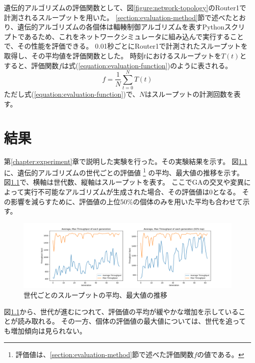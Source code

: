 \documentclass[a4paper,11pt]{jreport}
\newcommand{\figref}[1]{図\ref{#1}}
\newcommand{\chapref}[1]{第\ref{#1}章}
\newcommand{\secref}[1]{\ref{#1}節}
\newcommand{\equationref}[1]{式(\ref{#1})}
\begin{document}
遺伝的アルゴリズムの評価関数として、\figref{figure:network-topology}のRouter1で計測されるスループットを用いた。
\secref{section:evaluation-method}で述べたとおり、遺伝的アルゴリズムの各個体は輻輳制御アルゴリズムを表すPythonスクリプトであるため、これをネットワークシミュレータに組み込んで実行することで、その性能を評価できる。
0.01秒ごとにRouter1で計測されたスループットを取得し、その平均値を評価関数とした。
時刻$t$におけるスループットを$T(t)$とすると、評価関数$f$は\equationref{equation:evaluation-function}のように表される。
\begin{equation}
  \label{equation:evaluation-function}
  f = \frac{1}{N} \sum_{t=0}^{N} T(t)
\end{equation}
ただし\equationref{equation:evaluation-function}で、$N$はスループットの計測回数を表す。

\newpage

\chapter{結果}

\label{chapter:result}
\chapref{chapter:experiment}で説明した実験を行った。その実験結果を示す。
\figref{figure:generation_throughput}に、遺伝的アルゴリズムの世代ごとの評価値
\footnote{評価値は、\secref{section:evaluation-method}で述べた評価関数$f$の値である。}
の平均、最大値の推移を示す。
\figref{figure:generation_throughput}で、横軸は世代数、縦軸はスループットを表す。
ここでGAの交叉や変異によって実行不可能なアルゴリズムが生成された場合、その評価値は0となる。
その影響を減らすために、評価値の上位50\%の個体のみを用いた平均も合わせて示す。
\begin{figure}[htbp]
  \setlength\fboxsep{0pt}
  \centering
  \includegraphics[width=1.0\linewidth]{fig/chap05/generation_throughput.png}
  \caption{世代ごとのスループットの平均、最大値の推移}
  \label{figure:generation_throughput}
\end{figure}
\figref{figure:generation_throughput}から、世代が進むにつれて、評価値の平均が緩やかな増加を示していることが読み取れる。
その一方、個体の評価値の最大値については、世代を追っても増加傾向は見られない。
\end{document}
